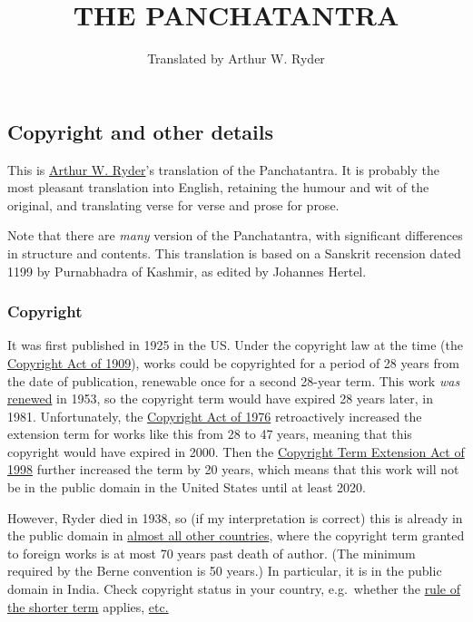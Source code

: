 \documentclass[article, twoside, 14pt]{memoir}
\title{THE PANCHATANTRA}
\author{Translated by Arthur W. Ryder}
\begin{document}
\maketitle

\tableofcontents

\subsection{Copyright and other details}

This is
\href{http://en.wikipedia.org/wiki/Arthur_W._Ryder}{Arthur W. Ryder}'s
translation of the Panchatantra. It is probably the most pleasant
translation into English, retaining the humour and wit of the
original, and translating verse for verse and prose for prose.

Note that there are \emph{many} version of the Panchatantra, with
significant differences in structure and contents. This translation
is based on a Sanskrit recension dated 1199 by Purnabhadra of
Kashmir, as edited by Johannes Hertel.

\subsubsection{Copyright}

It was first published in 1925 in the US. Under the copyright law
at the time (the
\href{http://en.wikipedia.org/wiki/Copyright_Act_of_1909}{Copyright Act of 1909}),
works could be copyrighted for a period of 28 years from the date
of publication, renewable once for a second 28-year term. This work
\emph{was}
\href{http://collections.stanford.edu/copyrightrenewals/bin/detail?fileID=697907992}{renewed}
in 1953, so the copyright term would have expired 28 years later,
in 1981. Unfortunately, the
\href{http://en.wikipedia.org/wiki/Copyright_Act_of_1976}{Copyright Act of 1976}
retroactively increased the extension term for works like this from
28 to 47 years, meaning that this copyright would have expired in
2000. Then the
\href{http://en.wikipedia.org/wiki/Copyright_Term_Extension_Act}{Copyright Term Extension Act of 1998}
further increased the term by 20 years, which means that this work
will not be in the public domain in the United States until at
least 2020.

However, Ryder died in 1938, so (if my interpretation is correct)
this is already in the public domain in
\href{http://en.wikipedia.org/wiki/List_of_countries%27_copyright_length}{almost all other countries},
where the copyright term granted to foreign works is at most 70
years past death of author. (The minimum required by the Berne
convention is 50 years.) In particular, it is in the public domain
in India. Check copyright status in your country, e.g.~whether the
\href{http://en.wikipedia.org/wiki/Rule_of_the_shorter_term}{rule of the shorter term}
applies, \href{http://www.copyright.gov/fls/fl100.html}{etc.}
\end{document}

